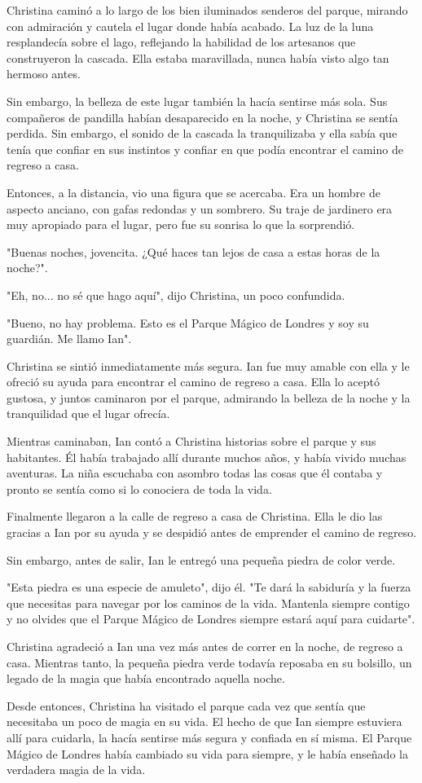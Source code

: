 
Christina caminó a lo largo de los bien iluminados senderos del parque, mirando con admiración y cautela el lugar donde había acabado. La luz de la luna resplandecía sobre el lago, reflejando la habilidad de los artesanos que construyeron la cascada. Ella estaba maravillada, nunca había visto algo tan hermoso antes.

Sin embargo, la belleza de este lugar también la hacía sentirse más sola. Sus compañeros de pandilla habían desaparecido en la noche, y Christina se sentía perdida. Sin embargo, el sonido de la cascada la tranquilizaba y ella sabía que tenía que confiar en sus instintos y confiar en que podía encontrar el camino de regreso a casa.

Entonces, a la distancia, vio una figura que se acercaba. Era un hombre de aspecto anciano, con gafas redondas y un sombrero. Su traje de jardinero era muy apropiado para el lugar, pero fue su sonrisa lo que la sorprendió.

"Buenas noches, jovencita. ¿Qué haces tan lejos de casa a estas horas de la noche?".

"Eh, no... no sé que hago aquí", dijo Christina, un poco confundida.

"Bueno, no hay problema. Esto es el Parque Mágico de Londres y soy su guardián. Me llamo Ian".

Christina se sintió inmediatamente más segura. Ian fue muy amable con ella y le ofreció su ayuda para encontrar el camino de regreso a casa. Ella lo aceptó gustosa, y juntos caminaron por el parque, admirando la belleza de la noche y la tranquilidad que el lugar ofrecía.

Mientras caminaban, Ian contó a Christina historias sobre el parque y sus habitantes. Él había trabajado allí durante muchos años, y había vivido muchas aventuras. La niña escuchaba con asombro todas las cosas que él contaba y pronto se sentía como si lo conociera de toda la vida.

Finalmente llegaron a la calle de regreso a casa de Christina. Ella le dio las gracias a Ian por su ayuda y se despidió antes de emprender el camino de regreso.

Sin embargo, antes de salir, Ian le entregó una pequeña piedra de color verde.

"Esta piedra es una especie de amuleto", dijo él. "Te dará la sabiduría y la fuerza que necesitas para navegar por los caminos de la vida. Mantenla siempre contigo y no olvides que el Parque Mágico de Londres siempre estará aquí para cuidarte".

Christina agradeció a Ian una vez más antes de correr en la noche, de regreso a casa. Mientras tanto, la pequeña piedra verde todavía reposaba en su bolsillo, un legado de la magia que había encontrado aquella noche.

Desde entonces, Christina ha visitado el parque cada vez que sentía que necesitaba un poco de magia en su vida. El hecho de que Ian siempre estuviera allí para cuidarla, la hacía sentirse más segura y confiada en sí misma. El Parque Mágico de Londres había cambiado su vida para siempre, y le había enseñado la verdadera magia de la vida.
